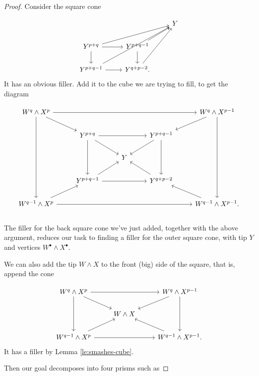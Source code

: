 \documentclass{amsart}
\theoremstyle{definition}
\begin{document}
\begin{proof}
    Consider the square cone

\[\begin{tikzcd}
	&& Y \\
	{Y^{p+q}} & {Y^{p+q-1}} \\
	{Y^{p+q-1}} & {Y^{q+p-2}.}
	\arrow[from=2-1, to=1-3]
	\arrow[from=2-1, to=2-2]
	\arrow[from=2-1, to=3-1]
	\arrow[from=2-2, to=1-3]
	\arrow[from=2-2, to=3-2]
	\arrow[from=3-1, to=1-3]
	\arrow[from=3-1, to=3-2]
	\arrow[from=3-2, to=1-3]
\end{tikzcd}\]
It has an obvious filler. Add it to the cube we are trying to fill, to get the diagram

\[\begin{tikzcd}
	{W^{q} \wedge X^{p}} &&&& {W^{q} \wedge X^{p-1}} \\
	& {Y^{p+q}} && {Y^{p+q-1}} \\
	&& Y \\
	& {Y^{p+q-1}} && {Y^{q+p-2}} \\
	{W^{q-1} \wedge X^{p}} &&&& {W^{q-1} \wedge X^{p-1}.}
	\arrow[from=1-1, to=1-5]
	\arrow[from=1-1, to=2-2]
	\arrow[from=1-1, to=5-1]
	\arrow[from=1-5, to=2-4]
	\arrow[from=1-5, to=5-5]
	\arrow[from=2-2, to=2-4]
	\arrow[from=2-2, to=3-3]
	\arrow[from=2-2, to=4-2]
	\arrow[from=2-4, to=3-3]
	\arrow[from=2-4, to=4-4]
	\arrow[from=4-2, to=3-3]
	\arrow[from=4-2, to=4-4]
	\arrow[from=4-4, to=3-3]
	\arrow[from=5-1, to=4-2]
	\arrow[from=5-1, to=5-5]
	\arrow[from=5-5, to=4-4]
\end{tikzcd}\]
\\
     The filler for the back square cone we've just added,
     together with the above argument, reduces our task to finding a filler for the outer square cone, with tip $Y$ and vertices $W^\bullet \wedge X^\bullet$.

     We can also add the tip $W \wedge X$ to the front (big) side of the square, that is, append the cone

\[\begin{tikzcd}
	{W^{q} \wedge X^{p}} && {W^{q} \wedge X^{p-1}} \\
	& {W \wedge X} \\
	{W^{q-1} \wedge X^{p}} && {W^{q-1} \wedge X^{p-1}.}
	\arrow[from=1-1, to=1-3]
	\arrow[from=1-1, to=2-2]
	\arrow[from=1-1, to=3-1]
	\arrow[from=1-3, to=2-2]
	\arrow[from=1-3, to=3-3]
	\arrow[from=3-1, to=2-2]
	\arrow[from=3-1, to=3-3]
	\arrow[from=3-3, to=2-2]
\end{tikzcd}\]
    It has a filler by Lemma \ref{le:smashes-cube}.

    Then our goal decomposes into four prisms such as


\end{proof}
\end{document}
